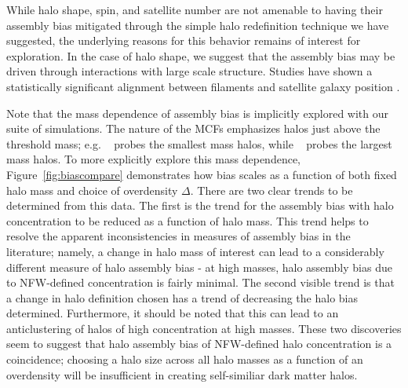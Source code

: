 \documentclass[usenatbib]{mnras}
\begin{document}


While halo shape, spin, and satellite number are not amenable to having their assembly bias mitigated through the
simple halo redefinition technique we have suggested, the underlying reasons for this behavior remains of
interest for exploration. In the case of halo shape, we suggest that the assembly bias may be driven through
interactions with large scale structure. Studies have shown a statistically significant alignment between
filaments and satellite galaxy position \citep{tempel_etal15, velliscig_etal15}.

Note that the mass dependence of assembly bias is implicitly explored with our suite of simulations.
The nature of the MCFs emphasizes halos just above the threshold mass; e.g. \simA~ probes the smallest mass
halos, while \simB~ probes the largest mass halos. To more explicitly explore this mass dependence, Figure~\ref{fig:biascompare}
demonstrates how bias scales as a function of both fixed halo mass and choice of overdensity $\Delta$.
There are two clear trends to be determined from this data. The first is the trend for the assembly bias with
halo concentration to be reduced as a function of halo mass. This trend helps to resolve the apparent
inconsistencies in measures of assembly bias in the literature; namely, a change in halo mass of
interest can lead to a considerably different measure of halo assembly bias - at high masses, halo assembly
bias due to NFW-defined concentration is fairly minimal. The second visible trend is that a change in halo
definition chosen has a trend of decreasing the halo bias determined. Furthermore, it should be noted that this
can lead to an anticlustering of halos of high concentration at high masses. These two discoveries seem to
suggest that halo assembly bias of NFW-defined halo concentration is a coincidence; choosing a halo size
across all halo masses as a function of an overdensity will be insufficient in creating self-similiar dark
matter halos.
\end{document}
